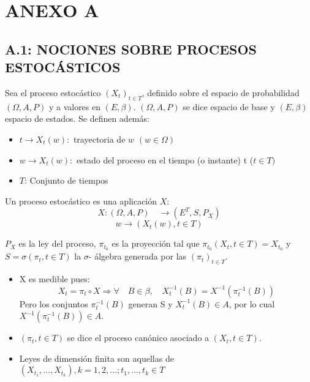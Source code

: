 \chapter*{ANEXO A}
\section*{A.1: NOCIONES SOBRE PROCESOS ESTOC\'{A}STICOS}

Sea el proceso estoc\'{a}stico $\left( {X_{t} } \right)_{t\in T}$, definido sobre el espacio de probabilidad $(\Omega ,A ,P)$ y a valores en $(E,\beta )$. $(\Omega ,A ,P)$ se dice espacio de base y $(E,\beta )$ espacio de estados. Se definen adem\'{a}s:

\begin{itemize}
\item $t\to X_{t} \left( w \right):$ trayectoria de $w$ $\left( {w\in \Omega } \right)$
\item $w\to X_{t} \left( w \right):$ estado del proceso en el tiempo (o instante) t ($t\in T)$
\item $T$: Conjunto de tiempos
\end{itemize}

Un proceso estoc\'{a}stico es una aplicaci\'{o}n $X$:
\[
X: (\Omega ,A ,P) \quad \to\limits (E^{T}, S ,P_{X} )
\]
\[
w\to \left( {X_{t} \left( w \right),t\in T} \right)
\]

$P_{X}$ es la ley del proceso, $\pi_{t_{0}}$ es la proyecci\'{o}n tal que $\pi_{t_{0} } \left( {X_{t} , t\in T} \right)=X_{t_{0} }$ y $S=\sigma \left( {\pi_{t}, t\in T} \right)$ la $\sigma$- \'{a}lgebra generada por las $\left( {\pi_{t} } \right)_{t\in T} $.

\begin{itemize}
      \item X es medible pues: 
\[
X_{t} =\pi_{t} \circ X\Rightarrow \forall \quad B\in \beta,\quad X_{t}^{-1} \left( B \right)=X^{-1}\left( {\pi_{t}^{-1} \left( B \right)} \right)
\]
Pero los conjuntos $\pi_{t}^{-1} (B)$ generan S y $X_{t}^{-1} (B)\in A$, por lo cual $X^{-1} (\pi_{t}^{-1} (B))\in A$.
      
      \item $\left( {\pi_{t}, t\in T} \right)$ se dice el proceso can\'{o}nico asociado a $\left( {X_{t}, t\in T} \right)$.
      \item Leyes de dimensi\'{o}n finita son aquellas de $\left( {X_{t_{1} } ,\ldots, X_{t_{k} } } \right), k=1,2,\ldots;t_{1},\ldots,t_{k} \in T$
\end{itemize}

